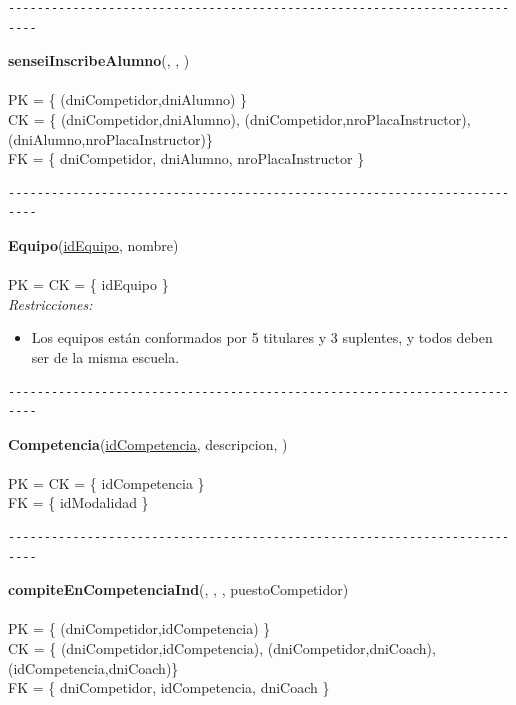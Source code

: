 \begin{verbatim}
--------------------------------------------------------------------------
\end{verbatim}

\noindent\textbf{senseiInscribeAlumno}(, , )
\\
\\
PK = \{ (dniCompetidor,dniAlumno) \} \\
CK = \{ (dniCompetidor,dniAlumno), (dniCompetidor,nroPlacaInstructor), (dniAlumno,nroPlacaInstructor)\} \\
FK = \{ dniCompetidor, dniAlumno, nroPlacaInstructor \} \\


\begin{verbatim}
--------------------------------------------------------------------------
\end{verbatim}

\noindent\textbf{Equipo}(\uline{idEquipo}, nombre)
\\
\\
PK = CK = \{ idEquipo \} \\

\textit{Restricciones:}
\begin{itemize}
	\item Los equipos están conformados por 5 titulares y 3 suplentes, y todos deben ser de la misma escuela.
\end{itemize}


\begin{verbatim}
--------------------------------------------------------------------------
\end{verbatim}

\noindent\textbf{Competencia}(\uline{idCompetencia}, descripcion, )
\\
\\
PK = CK = \{ idCompetencia \} \\
FK = \{ idModalidad \} \\

\begin{verbatim}
--------------------------------------------------------------------------
\end{verbatim}

\noindent\textbf{compiteEnCompetenciaInd}(, , , puestoCompetidor)
\\
\\
PK = \{ (dniCompetidor,idCompetencia) \} \\
CK = \{ (dniCompetidor,idCompetencia), (dniCompetidor,dniCoach), (idCompetencia,dniCoach)\} \\
FK = \{ dniCompetidor, idCompetencia, dniCoach \} \\

